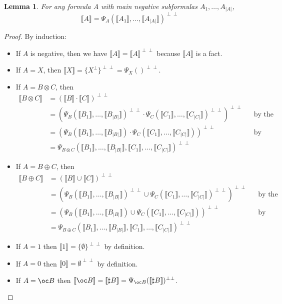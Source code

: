 \documentclass[11pt]{article}
\newtheorem{lemma}[theorem]{Lemma}
\newcommand\0{\textbf{0}}
\newcommand\1{\textbf{1}}
\newcommand\size[1]{{\lvert #1 \rvert}}
\newcommand\sem[1]{{\llbracket #1 \rrbracket}}
\newcommand\biperp{{\perp\perp}}
\begin{document}
\begin{lemma}
    \label{positivity}
    For any formula A with main negative subformulas $A_1, \dots, A_\size{A}$,
    $$\sem{A} = \Psi_A(\sem{A_1}, \dots, \sem{A_\size{A}})^\biperp$$
\end{lemma}
\begin{proof}
    By induction:
    \begin{itemize}
        \item If $A$ is negative, then we have $\sem{A} = \sem{A}^\biperp$ because $\sem{A}$ is a fact.
        \item If $A = X$, then $\sem{X} = \{X^\perp\}^\biperp = \Psi_X()^\biperp$.
        \item If $A = B \otimes C$, then \begin{align*}
            \sem{B \otimes C}
            &= (\sem{B} \cdot \sem{C})^\biperp \\
            &= (\Psi_B(\sem{B_1}, \dots, \sem{B_\size{B}})^\biperp \cdot \Psi_C(\sem{C_1}, \dots, \sem{C_\size{C}})^\biperp)^\biperp &&\text{by the induction hypothesis} \\
            &= (\Psi_B(\sem{B_1}, \dots, \sem{B_\size{B}}) \cdot \Psi_C(\sem{C_1}, \dots, \sem{C_\size{C}}))^\biperp &&\text{by positivity} \\
            &= \Psi_{B \otimes C}(\sem{B_1}, \dots, \sem{B_\size{B}}, \sem{C_1}, \dots, \sem{C_\size{C}})^\biperp
        \end{align*}
        \item If $A = B \oplus C$, then \begin{align*}
            \sem{B \oplus C}
            &= (\sem{B} \cup \sem{C})^\biperp \\
            &= (\Psi_B(\sem{B_1}, \dots, \sem{B_\size{B}})^\biperp \cup \Psi_C(\sem{C_1}, \dots, \sem{C_\size{C}})^\biperp)^\biperp &&\text{by the induction hypothesis} \\
            &= (\Psi_B(\sem{B_1}, \dots, \sem{B_\size{B}}) \cup \Psi_C(\sem{C_1}, \dots, \sem{C_\size{C}}))^\biperp &&\text{by positivity} \\
            &= \Psi_{B \oplus C}(\sem{B_1}, \dots, \sem{B_\size{B}}, \sem{C_1}, \dots, \sem{C_\size{C}})^\biperp
        \end{align*}
        \item If $A = 1$ then $\sem{1} = \{\emptyset\}^\biperp$ by definition.
        \item If $A = 0$ then $\sem{0} = \emptyset^\biperp$ by definition.
        \item If $A = \oc B$ then $\sem{\oc B} = \sem{\sharp B} = \Psi_{\oc B}(\sem{\sharp B})^\biperp$.
    \end{itemize}
\end{proof}
\end{document}
